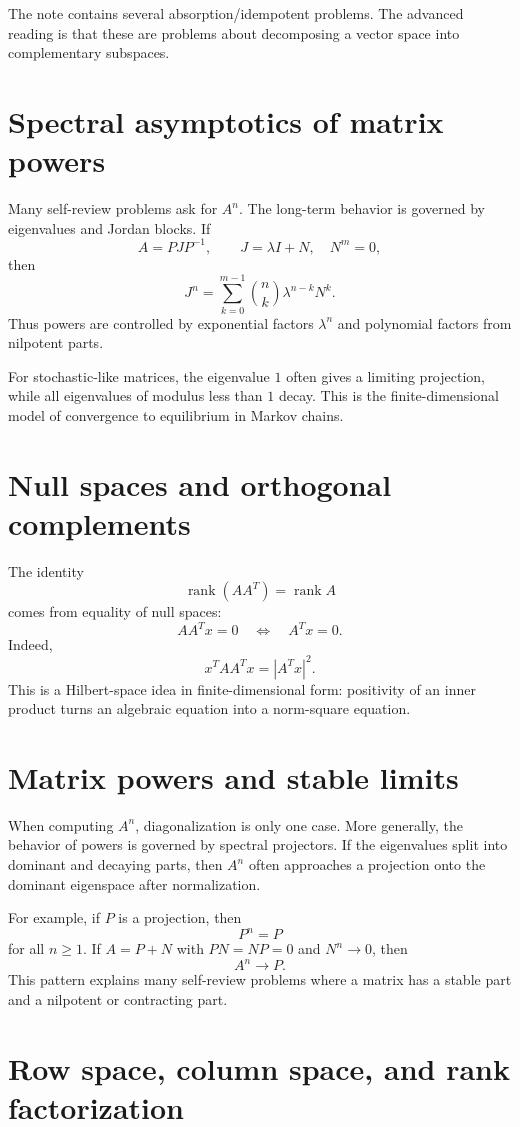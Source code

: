 The note contains several absorption/idempotent problems.  The advanced reading is that these are problems about decomposing a vector space into complementary subspaces.

\section{Spectral asymptotics of matrix powers}

Many self-review problems ask for $A^n$.  The long-term behavior is governed by eigenvalues and Jordan blocks.  If
\[
  A=PJP^{-1},\qquad J=\lambda I+N,\quad N^m=0,
\]
then
\[
  J^n=\sum_{k=0}^{m-1}\binom nk \lambda^{n-k}N^k.
\]
Thus powers are controlled by exponential factors $\lambda^n$ and polynomial factors from nilpotent parts.

For stochastic-like matrices, the eigenvalue $1$ often gives a limiting projection, while all eigenvalues of modulus less than $1$ decay.  This is the finite-dimensional model of convergence to equilibrium in Markov chains.

\section{Null spaces and orthogonal complements}

The identity
\[
  \operatorname{rank}(AA^T)=\operatorname{rank}A
\]
comes from equality of null spaces:
\[
  AA^Tx=0\quad\Longleftrightarrow\quad A^Tx=0.
\]
Indeed,
\[
  x^TAA^Tx=|A^Tx|^2.
\]
This is a Hilbert-space idea in finite-dimensional form: positivity of an inner product turns an algebraic equation into a norm-square equation.

\section{Matrix powers and stable limits}

When computing $A^n$, diagonalization is only one case.  More generally, the behavior of powers is governed by spectral projectors.  If the eigenvalues split into dominant and decaying parts, then $A^n$ often approaches a projection onto the dominant eigenspace after normalization.

For example, if $P$ is a projection, then
\[
  P^n=P
\]
for all $n\ge1$.  If $A=P+N$ with $PN=NP=0$ and $N^n\to0$, then
\[
  A^n\to P.
\]
This pattern explains many self-review problems where a matrix has a stable part and a nilpotent or contracting part.

\section{Row space, column space, and rank factorization}

